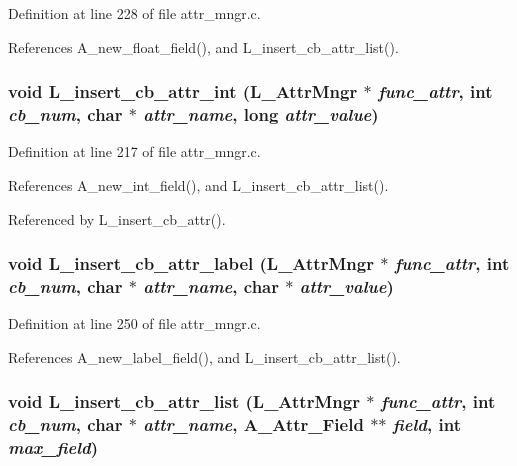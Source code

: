 Definition at line 228 of file attr\_\-mngr.c.

References A\_\-new\_\-float\_\-field(), and L\_\-insert\_\-cb\_\-attr\_\-list().
\subsubsection{\setlength{\rightskip}{0pt plus 5cm}void L\_\-insert\_\-cb\_\-attr\_\-int (\bf{L\_\-Attr\-Mngr} $\ast$ {\em func\_\-attr}, int {\em cb\_\-num}, char $\ast$ {\em attr\_\-name}, long {\em attr\_\-value})}\label{attr__mngr_8c_7e670d1d8323b2629e941d20ae7d6f9a}




Definition at line 217 of file attr\_\-mngr.c.

References A\_\-new\_\-int\_\-field(), and L\_\-insert\_\-cb\_\-attr\_\-list().

Referenced by L\_\-insert\_\-cb\_\-attr().
\subsubsection{\setlength{\rightskip}{0pt plus 5cm}void L\_\-insert\_\-cb\_\-attr\_\-label (\bf{L\_\-Attr\-Mngr} $\ast$ {\em func\_\-attr}, int {\em cb\_\-num}, char $\ast$ {\em attr\_\-name}, char $\ast$ {\em attr\_\-value})}\label{attr__mngr_8c_2bd642fd3a1750bc0f86173a744cac9a}




Definition at line 250 of file attr\_\-mngr.c.

References A\_\-new\_\-label\_\-field(), and L\_\-insert\_\-cb\_\-attr\_\-list().
\subsubsection{\setlength{\rightskip}{0pt plus 5cm}void L\_\-insert\_\-cb\_\-attr\_\-list (\bf{L\_\-Attr\-Mngr} $\ast$ {\em func\_\-attr}, int {\em cb\_\-num}, char $\ast$ {\em attr\_\-name}, \bf{A\_\-Attr\_\-Field} $\ast$$\ast$ {\em field}, int {\em max\_\-field})}\label{attr__mngr_8c_d1d69cb2730317f0eb24bb1b367f855e}





